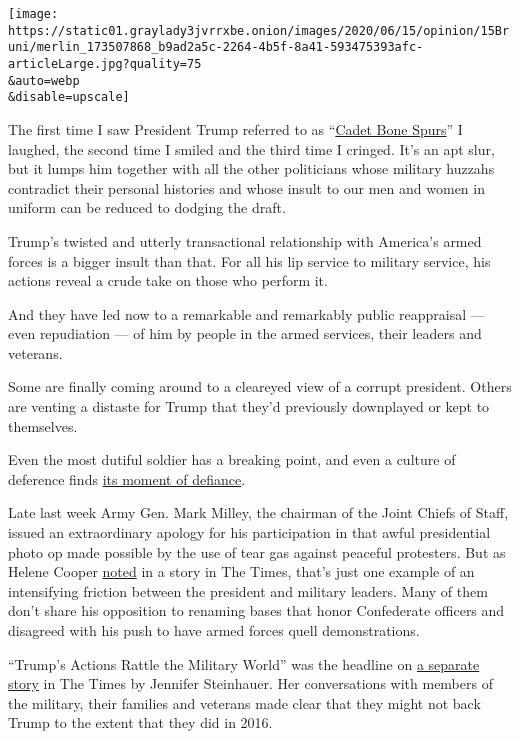 \texttt{[image: https://static01.graylady3jvrrxbe.onion/images/2020/06/15/opinion/15Bruni/merlin\_173507868\_b9ad2a5c-2264-4b5f-8a41-593475393afc-articleLarge.jpg?quality=75\\\&auto=webp\\\&disable=upscale]}

The first time I saw President Trump referred to as
``\href{https://www.cnn.com/2018/02/06/politics/tammy-duckworth-cadet-bone-spurs/index.html}{Cadet
Bone Spurs}'' I laughed, the second time I smiled and the third time I
cringed. It's an apt slur, but it lumps him together with all the other
politicians whose military huzzahs contradict their personal histories
and whose insult to our men and women in uniform can be reduced to
dodging the draft.

Trump's twisted and utterly transactional relationship with America's
armed forces is a bigger insult than that. For all his lip service to
military service, his actions reveal a crude take on those who perform
it.

And they have led now to a remarkable and remarkably public reappraisal
--- even repudiation --- of him by people in the armed services, their
leaders and veterans.

Some are finally coming around to a cleareyed view of a corrupt
president. Others are venting a distaste for Trump that they'd
previously downplayed or kept to themselves.

Even the most dutiful soldier has a breaking point, and even a culture
of deference finds
\href{https://time.com/5849362/military-leaders-denounce-trump/}{its
moment of defiance}.

Late last week Army Gen. Mark Milley, the chairman of the Joint Chiefs
of Staff, issued an extraordinary apology for his participation in that
awful presidential photo op made possible by the use of tear gas against
peaceful protesters. But as Helene Cooper
\href{https://www.nytimes3xbfgragh.onion/2020/06/11/us/politics/trump-milley-military-protests-lafayette-square.html?action=click\&module=RelatedLinks\&pgtype=Article}{noted}
in a story in The Times, that's just one example of an intensifying
friction between the president and military leaders. Many of them don't
share his opposition to renaming bases that honor Confederate officers
and disagreed with his push to have armed forces quell demonstrations.

``Trump's Actions Rattle the Military World'' was the headline on
\href{https://www.nytimes3xbfgragh.onion/2020/06/12/us/politics/trump-polls-military-approval.html?smid=tw-share}{a
separate story} in The Times by Jennifer Steinhauer. Her conversations
with members of the military, their families and veterans made clear
that they might not back Trump to the extent that they did in 2016.

